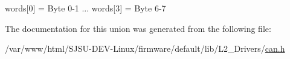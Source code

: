 words\mbox{[}0\mbox{]} = Byte 0-\/1 ... words\mbox{[}3\mbox{]} = Byte 6-\/7 



The documentation for this union was generated from the following file\+:\begin{DoxyCompactItemize}
\item 
/var/www/html/\+S\+J\+S\+U-\/\+D\+E\+V-\/\+Linux/firmware/default/lib/\+L2\+\_\+\+Drivers/\hyperlink{can_8h}{can.\+h}\end{DoxyCompactItemize}
